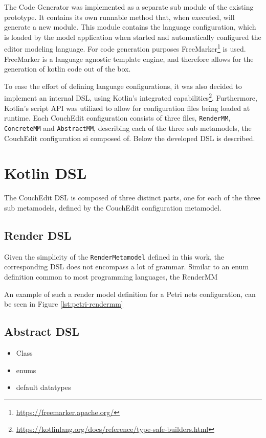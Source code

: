 The Code Generator was implemented as a separate sub module of the existing prototype. It contains its own runnable method that, when executed, will generate a new module. This module contains the language configuration, which is loaded by the model application when started and automatically configured the editor modeling language. For code generation purposes FreeMarker\footnote{\url{https://freemarker.apache.org/}} is used. FreeMarker is a language agnostic template engine, and therefore allows for the generation of kotlin code out of the box. 

To ease the effort of defining language configurations, it was also decided to implement an internal DSL, using Kotlin's integrated capabilities\footnote{\url{https://kotlinlang.org/docs/reference/type-safe-builders.html}}. Furthermore, Kotlin's script API was utilized to allow for configuration files being loaded at runtime. Each CouchEdit configuration consists of three files, \texttt{RenderMM}, \texttt{ConcreteMM} and \texttt{AbstractMM}, describing each of the three sub metamodels, the CouchEdit configuration si composed of. Below the developed DSL is described.

\section{Kotlin DSL}
The CouchEdit DSL is composed of three distinct parts, one for each of the three sub metamodels, defined by the CouchEdit configuration metamodel. 

\subsection{Render DSL}
Given the simplicity of the \texttt{RenderMetamodel} defined in this work, the corresponding DSL does not encompass a lot of grammar. Similar to an enum definition common to most programming languages, the RenderMM 


An example of such a render model definition for a Petri nets configuration, can be seen in Figure \ref{lst:petri-rendermm}

\subsection{Abstract DSL}



\begin{itemize}
  \item Class
  \item enums
  \item default datatypes
\end{itemize}



